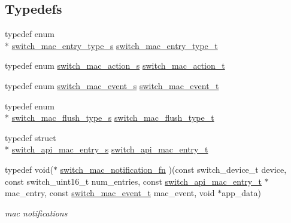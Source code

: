 \subsection*{Typedefs}
\begin{DoxyCompactItemize}
\item 
typedef enum \\*
\hyperlink{group__L2_ga8bbe19fdfe987704725c338646303cb4}{switch\+\_\+mac\+\_\+entry\+\_\+type\+\_\+s} \hyperlink{group__L2_gae4c546ddb72c6390d040cfa329cfe024}{switch\+\_\+mac\+\_\+entry\+\_\+type\+\_\+t}
\item 
typedef enum \hyperlink{group__L2_ga41cd4aa537a1dfbe6380d619f28e8a6b}{switch\+\_\+mac\+\_\+action\+\_\+s} \hyperlink{group__L2_ga81675f7440ac9d8c53f957e4ec214cb1}{switch\+\_\+mac\+\_\+action\+\_\+t}
\item 
typedef enum \hyperlink{group__L2_ga49d8f781f5ef73c8afdbb7abbdb23a60}{switch\+\_\+mac\+\_\+event\+\_\+s} \hyperlink{group__L2_ga3728e834d7a424815bf0285e02ed0074}{switch\+\_\+mac\+\_\+event\+\_\+t}
\item 
typedef enum \\*
\hyperlink{group__L2_ga852b825e1cfbfd08e4bc21e0fc5c548c}{switch\+\_\+mac\+\_\+flush\+\_\+type\+\_\+s} \hyperlink{group__L2_gabcf4ebaee3a7b04a2a48d64b9d2aceb9}{switch\+\_\+mac\+\_\+flush\+\_\+type\+\_\+t}
\item 
typedef struct \\*
\hyperlink{structswitch__api__mac__entry__s}{switch\+\_\+api\+\_\+mac\+\_\+entry\+\_\+s} \hyperlink{group__L2_ga2fde8bafec6b710770603b5cde2f94af}{switch\+\_\+api\+\_\+mac\+\_\+entry\+\_\+t}
\item 
typedef void($\ast$ \hyperlink{group__L2_ga233660168fb17cb2141539df12af924c}{switch\+\_\+mac\+\_\+notification\+\_\+fn} )(const switch\+\_\+device\+\_\+t device, const switch\+\_\+uint16\+\_\+t num\+\_\+entries, const \hyperlink{group__L2_ga2fde8bafec6b710770603b5cde2f94af}{switch\+\_\+api\+\_\+mac\+\_\+entry\+\_\+t} $\ast$mac\+\_\+entry, const \hyperlink{group__L2_ga3728e834d7a424815bf0285e02ed0074}{switch\+\_\+mac\+\_\+event\+\_\+t} mac\+\_\+event, void $\ast$app\+\_\+data)
\begin{DoxyCompactList}\small\item\em mac notifications \end{DoxyCompactList}\end{DoxyCompactItemize}
